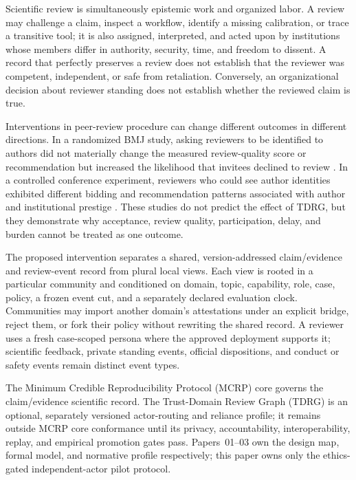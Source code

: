 \documentclass[11pt]{article}
\newcommand{\tdrg}{TDRG}
\begin{document}
Scientific review is simultaneously epistemic work and organized labor. A review
may challenge a claim, inspect a workflow, identify a missing calibration, or trace
a transitive tool; it is also assigned, interpreted, and acted upon by institutions
whose members differ in authority, security, time, and freedom to dissent. A record
that perfectly preserves a review does not establish that the reviewer was
competent, independent, or safe from retaliation. Conversely, an organizational
decision about reviewer standing does not establish whether the reviewed claim is
true.

Interventions in peer-review procedure can change different outcomes in different
directions. In a randomized BMJ study, asking reviewers to be identified to authors
did not materially change the measured review-quality score or recommendation but
increased the likelihood that invitees declined to review
\citep{vanrooyen1999open}. In a controlled conference experiment, reviewers who
could see author identities exhibited different bidding and recommendation patterns
associated with author and institutional prestige \citep{tomkins2017bias}. These
studies do not predict the effect of \tdrg{}, but they demonstrate why acceptance,
review quality, participation, delay, and burden cannot be treated as one outcome.

The proposed intervention separates a shared, version-addressed claim/evidence and
review-event record from plural local views. Each view is rooted in a particular
community and conditioned on domain, topic, capability, role, case, policy, a
frozen event cut, and a separately declared evaluation clock. Communities may
import another domain's attestations under an explicit
bridge, reject them, or fork their policy without rewriting the shared record. A
reviewer uses a fresh case-scoped persona where the approved deployment supports
it; scientific feedback, private standing events, official dispositions, and
conduct or safety events remain distinct event types.

The Minimum Credible Reproducibility Protocol (MCRP) core governs the claim/evidence
scientific record. The Trust-Domain Review Graph (TDRG) is an optional, separately
versioned actor-routing and reliance profile; it remains outside MCRP core
conformance until its privacy, accountability, interoperability, replay, and
empirical promotion gates pass. Papers~01--03 own the design map, formal model, and
normative profile respectively; this paper owns only the ethics-gated
independent-actor pilot protocol.
\end{document}
